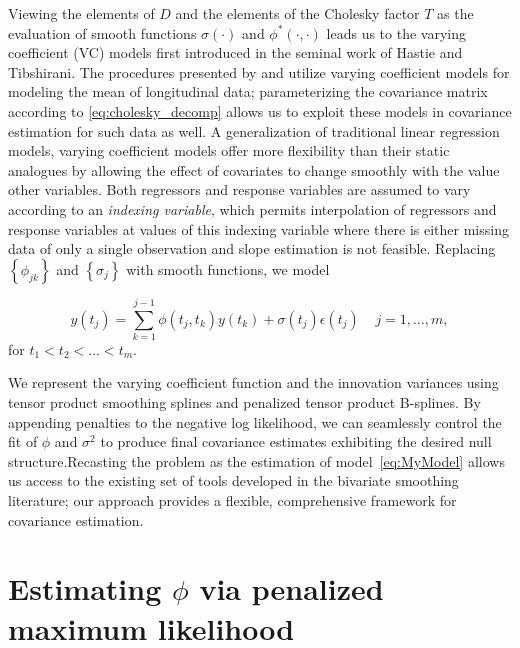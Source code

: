 \documentclass[12pt]{article}
\theoremstyle{definition}
\begin{document}
Viewing the elements of $D$ and the elements of the Cholesky factor $T$ as the evaluation of smooth functions $\sigma\left(\cdot\right)$ and $\phi^*\left(\cdot,\cdot\right)$ leads us to the varying coefficient (VC) models first introduced in the seminal work of Hastie and Tibshirani.  The procedures presented by \citet{fan2000two} and \citet{huang2002varying} utilize varying coefficient models for modeling the mean of longitudinal data; parameterizing the covariance matrix according to \ref{eq:cholesky_decomp} allows us to exploit these models in covariance estimation for such data as well.  A generalization of traditional linear regression models, varying coefficient models offer more flexibility than their static analogues by allowing the effect of covariates to change smoothly with the value other variables. Both regressors and response variables are assumed to vary according to an \emph{indexing variable}, which  permits interpolation of regressors and response variables at values of this indexing variable where there is either missing data of only a single observation and slope estimation is not feasible.  Replacing  $\left \{ \phi_{jk} \right\}$ and $\left\{ \sigma_j \right\}$ with smooth functions, we model 

\begin{equation}   
y\left(t_j \right)  = \sum_{k=1}^{j-1} \phi\left(t_j ,t_k\right) y\left(t_k\right) + \sigma\left(t_j\right)\epsilon\left({t_j}\right) \;\;\;\; j=1,\dots, m, 
\label{eq:MyModel} 
\end{equation}
\noindent for $t_1 < t_2 < \dots < t_m$. 


We represent the varying coefficient function and the innovation variances using tensor product smoothing splines and penalized tensor product B-splines. By appending penalties to the negative log likelihood, we can seamlessly control the fit of $\phi$ and $\sigma^2$  to produce final covariance estimates exhibiting the desired null structure.Recasting the problem as the estimation of model~\ref{eq:MyModel} allows us access to the existing set of tools developed in the bivariate smoothing literature; our approach provides a flexible, comprehensive framework for covariance estimation.


\section{Estimating $\phi$ via penalized maximum likelihood}
\end{document}

